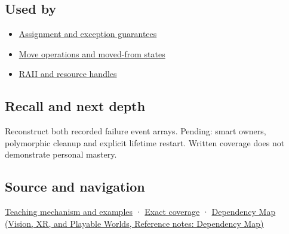 \subsection{Used by}\label{appendix-9bfe377cef7a-used-by}

\hypertarget{appendix-9bfe377cef7a-used-by}{}

\begin{itemize}
\tightlist
\item
  \hyperref[appendix-bea6beb5350f]{Assignment and exception guarantees}
\item
  \hyperref[appendix-5636651017c2]{Move operations and moved-from states}
\item
  \hyperref[appendix-69739d3ab49b]{RAII and resource handles}
\end{itemize}

\subsection{Recall and next depth}\label{appendix-9bfe377cef7a-recall-and-next-depth}

\hypertarget{appendix-9bfe377cef7a-recall-and-next-depth}{}

Reconstruct both recorded failure event arrays. Pending: smart owners, polymorphic cleanup and explicit lifetime restart. Written coverage does not demonstrate personal mastery.

\subsection{Source and navigation}\label{appendix-9bfe377cef7a-source-and-navigation}

\hypertarget{appendix-9bfe377cef7a-source-and-navigation}{}

\hyperref[01-foundations-i-ch003-destruction-closes-the-ownership-interval]{Teaching mechanism and examples} · \hyperref[appendix-fd090d982a15-m009---parts-127-147]{Exact coverage} · \href{../07-Vision-XR-and-Playable-Worlds/main.pdf\#nameddest=appendix-4ad47bdd269a}{Dependency Map (Vision, XR, and Playable Worlds, Reference notes: Dependency Map)}
